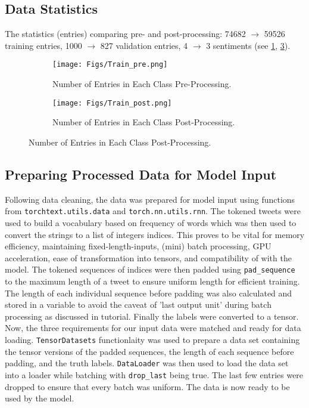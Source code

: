 \subsection{Data Statistics}
\vspace{-1em}
The statistics (entries) comparing pre- and post-processing: 74682 $\rightarrow$ 59526 training entries, 1000 $\rightarrow$ 827 validation entries, 4 $\rightarrow$ 3 sentiments (see \ref{fig:stats1}, \ref{fig:stats2}).

\begin{figure}[!ht]
    \begin{subfigure}{0.48\textwidth}
        \centering
        \texttt{[image: Figs/Train\_pre.png]}
        \caption{Number of Entries in Each Class Pre-Processing.}
        \label{fig:stats1}
    \end{subfigure}
    \hfill
    \begin{subfigure}{0.48\textwidth}
        \centering
        \texttt{[image: Figs/Train\_post.png]}
        \caption{Number of Entries in Each Class Post-Processing.}
        \label{fig:stats2}
    \end{subfigure}
    \hfill
\end{figure}

\vspace{-1em}
\subsection{Preparing Processed Data for Model Input}
\vspace{-1em}
Following data cleaning, the data was prepared for model input using functions from \texttt{torchtext.utils.data} and \texttt{torch.nn.utils.rnn}. The tokened tweets were used to build a vocabulary based on frequency of words which was then used to convert the strings to a list of integers indices. This proves to be vital for memory efficiency, maintaining fixed-length-inputs, (mini) batch processing, GPU acceleration, ease of transformation into tensors, and compatibility of with the model. The tokened sequences of indices were then padded using \texttt{pad\_sequence} to the maximum length of a tweet to ensure uniform length for efficient training. The length of each individual sequence before padding was also calculated and stored in a variable to avoid the caveat of 'last output unit' during batch processing as discussed in tutorial. Finally the labels were converted to a tensor. Now, the three requirements for our input data were matched and ready for data loading. \texttt{TensorDatasets} functionlaity was used to prepare a data set containing the tensor versions of the padded sequences, the length of each sequence before padding, and the truth labels. \texttt{DataLoader} was then used to load the data set into a loader while batching with \texttt{drop\_last} being true. The last few entries were dropped to ensure that every batch was uniform. The data is now ready to be used by the model.